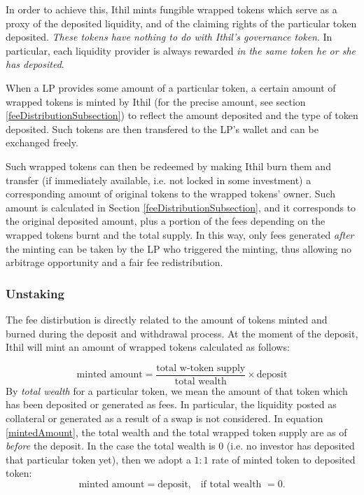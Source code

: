 \documentclass [10pt, fancyhdr, twoside] {article}
\begin{document}
In order to achieve this, Ithil mints fungible wrapped tokens which serve as a proxy of the deposited liquidity, and of the claiming rights of the particular token deposited. \textit{These tokens have nothing to do with Ithil's governance token}. In particular, each liquidity provider is always rewarded \textit{in the same token he or she has deposited}.

When a LP provides some amount of a particular token, a certain amount of wrapped tokens is minted by Ithil (for the precise amount, see section \ref{feeDistributionSubsection}) to reflect the amount deposited and the type of token deposited. Such tokens are then transfered to the LP's wallet and can be exchanged freely.

Such wrapped tokens can then be redeemed by making Ithil burn them and transfer (if immediately available, i.e. not locked in some investment) a corresponding amount of original tokens to the wrapped tokens' owner. Such amount is calculated in Section \ref{feeDistributionSubsection}, and it corresponds to the original deposited amount, plus a portion of the fees depending on the wrapped tokens burnt and the total supply. In this way, only fees generated \textit{after} the minting can be taken by the LP who triggered the minting, thus allowing no arbitrage opportunity and a fair fee redistribution.

\subsubsection{Unstaking}\label{unstakingSubsection}

The fee distirbution is directly related to the amount of tokens minted and burned during the deposit and withdrawal process. At the moment of the deposit, Ithil will mint an amount of wrapped tokens calculated as follows:

\begin{equation}\label{mintedAmount}
\text{minted amount} = \frac{\text{total w-token supply}}{\text{total wealth}}\times\text{deposit}  
\end{equation}
By \textit{total wealth} for a particular token, we mean the amount of that token which has been deposited or generated as fees. In particular, the liquidity posted as collateral or generated as a result of a swap is not considered. In equation \eqref{mintedAmount}, the total wealth and the total wrapped token supply are as of \textit{before} the deposit. In the case the total wealth is $0$ (i.e. no investor has deposited that particular token yet), then we adopt a $1:1$ rate of minted token to deposited token: 
\begin{equation}\label{mintedAmountZeroWealth}
\text{minted amount} = \text{deposit,} \ \ \ \text{ if total wealth } = 0.
\end{equation}
\end{document}
